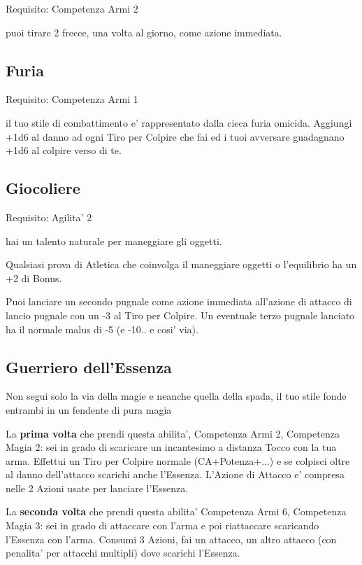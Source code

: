 \documentclass[a4paper,11pt,twoside,openany]{dndbook}
\begin{document}
Requisito: Competenza Armi 2

puoi tirare 2 frecce, una volta al giorno, come azione immediata.

\subsection{Furia}

Requisito: Competenza Armi 1

il tuo stile di combattimento e' rappresentato dalla cieca furia omicida. Aggiungi +1d6 al danno ad ogni Tiro per Colpire che fai ed i tuoi avversare guadagnano +1d6 al colpire verso di te. 

\subsection{Giocoliere}

Requisito: Agilita' 2

hai un talento naturale per maneggiare gli oggetti.

Qualsiasi prova di Atletica che coinvolga il maneggiare oggetti o l'equilibrio ha un +2 di Bonus.

Puoi lanciare un secondo pugnale come azione immediata all'azione di attacco di lancio pugnale con un -3 al Tiro per Colpire. Un eventuale terzo pugnale lanciato ha il normale malus di -5 (e -10.. e cosi' via).

\subsection{Guerriero dell'Essenza}

Non segui solo la via della magie e neanche quella della spada, il tuo stile fonde entrambi in un fendente di pura magia

La \textbf{prima volta} che prendi questa abilita', Competenza Armi 2, Competenza Magia 2: sei in grado di scaricare un incantesimo a distanza Tocco con la tua arma. Effettui un Tiro per Colpire normale (CA+Potenza+...) e se colpisci oltre al danno dell'attacco scarichi anche l'Essenza. L'Azione di Attacco e' compresa nelle 2 Azioni usate per lanciare l'Essenza.

La \textbf{seconda volta} che prendi questa abilita' Competenza Armi 6, Competenza Magia 3: sei in grado di attaccare con l'arma e poi riattaccare scaricando l'Essenza con l'arma. Consumi 3 Azioni, fai un attacco, un altro attacco (con penalita' per attacchi multipli) dove scarichi l'Essenza.
\end{document}
